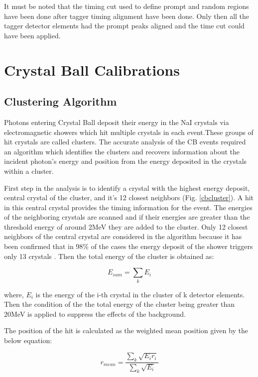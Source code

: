 \indent It must be noted that the timing cut used to define prompt and random regions have been done after tagger timing alignment have been done. Only then all the tagger detector elements had the prompt peaks aligned and the time cut could have been applied.

\section{Crystal Ball Calibrations}

\subsection{Clustering Algorithm}

\indent Photons entering Crystal Ball deposit their energy in the NaI crystals via electromagnetic showers which hit multiple crystals in each event.These groups of hit crystals are called clusters. The accurate analysis of the CB events required an algorithm which identifies the clusters and recovers information about the incident photon's energy and position from the energy deposited in the crystals within a cluster.

\indent First step in the analysis is to identify a crystal with the highest energy deposit, central crystal of the cluster, and it's 12 closest neighbors (Fig. \ref{cbcluster}). A hit in this central crystal provides the timing information for the event. The energies of the neighboring crystals are scanned and if their energies are greater than the threshold energy of around 2MeV they are added to the cluster. Only 12 closest neighbors of the central crystal are considered in the algorithm because it has been confirmed that in 98\% of the cases the energy deposit of the shower triggers only 13 crystals \cite{claire}. Then the total energy of the cluster is obtained as:

\begin{equation}
E_{sum}=\sum_{k}E_{i}
\end{equation}

where, $E_{i}$ is the energy of the i-th crystal in the cluster of k detector elements. Then the condition of the the total energy of the cluster being greater than 20MeV  is applied to suppress the effects of the background.

\indent The position of the hit is calculated as the weighted mean position given by the below equation:

\begin{equation}
r_{mean}=\frac{\sum_{k}\sqrt{E_{i}r_{i}}}{\sum_{k}\sqrt{E_{i}}}
\end{equation}

